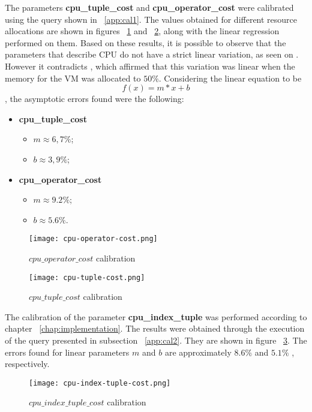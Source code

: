 The parameters \textbf{cpu\_tuple\_cost} and \textbf{cpu\_operator\_cost} were calibrated using the query shown in  ~\ref{app:cal1}. The values obtained for different resource allocations are shown in figures ~\ref{fig:cpuop} and ~\ref{fig:cputp}, along with the linear regression performed on them. Based on these results, it is possible to observe that the parameters that describe CPU do not have a strict linear variation, as seen on  \cite{4401021}. However it contradicts  \cite{Soror:2008:AVM:1376616.1376711}, which affirmed that this variation was linear when the memory for the VM was allocated to $50\%$. Considering the linear equation to be
\[
 f(x) = m*x + b
\],
the asymptotic errors found were the following:
\begin{itemize}
 \item \textbf{cpu\_tuple\_cost}
 \begin{itemize}
  \item $m \approx 6,7\% $;
  \item $b \approx 3,9\% $;
 \end{itemize}
  \item \textbf{cpu\_operator\_cost}
 \begin{itemize}
  \item $m \approx 9.2\% $;
  \item $b \approx 5.6\% $.
 \end{itemize}
\end{itemize}

 
 \begin{figure}[ht]
 \centering
 \texttt{[image: cpu-operator-cost.png]}
 \caption{$cpu\_operator\_cost$ calibration}
 \label{fig:cpuop}
 \end{figure} 
% 
% 
 \begin{figure}[ht]
 \centering
 \texttt{[image: cpu-tuple-cost.png]}
 \caption{$cpu\_tuple\_cost$ calibration}
 \label{fig:cputp}
 \end{figure} 
 
 The calibration of the parameter \textbf{cpu\_index\_tuple} was performed according to chapter ~\ref{chap:implementation}. The results were obtained through the execution of the query presented in subsection ~\ref{app:cal2}. They are shown in figure ~\ref{fig:cpuip}. The errors found for linear parameters $m$ and $b$ are approximately $8.6\%$ and $5.1\%$ , respectively.

 \begin{figure}[ht]
 \centering
 \texttt{[image: cpu-index-tuple-cost.png]}
 \caption{$cpu\_index\_tuple\_cost$ calibration}
 \label{fig:cpuip}
 \end{figure} 
 
